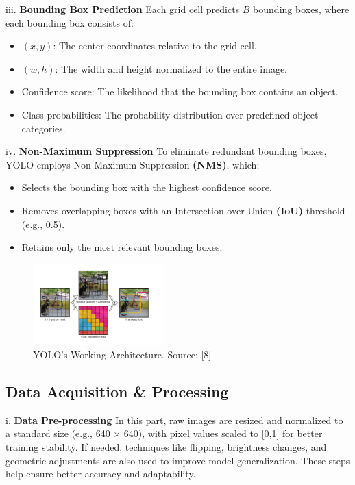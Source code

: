 \documentclass[journal,transmag]{IEEEtran}
\begin{document}
iii. \textbf{Bounding Box Prediction} Each grid cell predicts $B$ bounding boxes, where each bounding box consists of:
\begin{itemize}
  \setlength{\itemindent}{1em} 
  \item $(x, y)$: The center coordinates relative to the grid cell.
  \item $(w, h)$: The width and height normalized to the entire image.
  \item Confidence score: The likelihood that the bounding box contains an object.
  \item Class probabilities: The probability distribution over predefined object categories.
\end{itemize}

iv. \textbf{Non-Maximum Suppression} To eliminate redundant bounding boxes, YOLO employs Non-Maximum Suppression \textbf{(NMS)}, which:
\begin{itemize}
  \setlength{\itemindent}{2em} 
  \item Selects the bounding box with the highest confidence score.
  \item Removes overlapping boxes with an Intersection over Union \textbf{(IoU)} threshold (e.g., 0.5).
  \item Retains only the most relevant bounding boxes.
\end{itemize}

\begin{figure}[h]
    \centering
    \includegraphics[width=0.45\textwidth]{YOLO.png}
    \caption{YOLO's Working Architecture. Source: [8]}
    \label{fig:external_yolo}
\end{figure}




\subsection{Data Acquisition \& Processing}

i. \textbf{Data Pre-processing} In this part, raw images are resized and normalized to a standard size (e.g., 640 × 640), with pixel values scaled to [0,1] for better training stability. If needed, techniques like flipping, brightness changes, and geometric adjustments are also used to improve model generalization. These steps help ensure better accuracy and adaptability.
\end{document}
